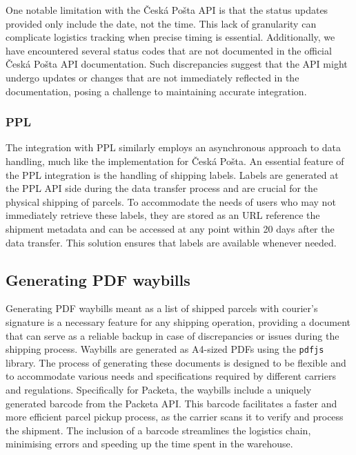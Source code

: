 One notable limitation with the Česká Pošta API is that the status updates provided only include the date, not the time. 
This lack of granularity can complicate logistics tracking when precise timing is essential.
Additionally, we have encountered several status codes that are not documented in the official Česká Pošta API documentation.
Such discrepancies suggest that the API might undergo updates or changes that are not immediately reflected in the documentation, posing a challenge to maintaining accurate integration.

\subsubsection{PPL}
The integration with PPL similarly employs an asynchronous approach to data handling, much like the implementation for Česká Pošta.
 An essential feature of the PPL integration is the handling of shipping labels. 
 Labels are generated at the PPL API side during the data transfer process and are crucial for the physical shipping of parcels. 
 To accommodate the needs of users who may not immediately retrieve these labels, they are stored as an URL reference the shipment metadata and can be accessed at any point within 20 days after the data transfer. 
 This solution ensures that labels are available whenever needed.

\subsection{Generating PDF waybills}
Generating PDF waybills meant as a list of shipped parcels with courier's signature is a necessary feature for any shipping operation, providing a document that can serve as a reliable backup in case of discrepancies or issues during the shipping process.
Waybills are generated as A4-sized PDFs using the \texttt{pdfjs} library.
The process of generating these documents is designed to be flexible and to accommodate various needs and specifications required by different carriers and regulations. 
Specifically for Packeta, the waybills include a uniquely generated barcode from the Packeta API. 
This barcode facilitates a faster and more efficient parcel pickup process, as the carrier scans it to verify and process the shipment. 
The inclusion of a barcode streamlines the logistics chain, minimising errors and speeding up the time spent in the warehouse.

